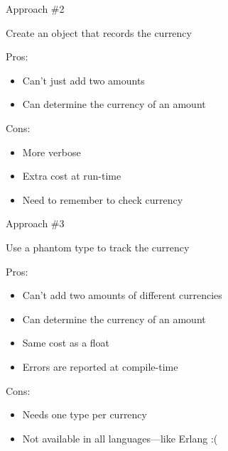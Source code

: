 \documentclass[11pt]{beamer}
\renewcommand\big[1]{
  \begin{center}
    \Large{#1}
  \end{center}
}
\begin{document}
\begin{frame}
  \big{Approach \#2}
  \centering Create an object that records the currency
  \pause
  \vskip1cm
  \begin{minipage}[t]{.48\textwidth}
    Pros:
    \footnotesize
    \begin{itemize}
      \item Can't just add two amounts
      \item Can determine the currency of an amount
    \end{itemize}
  \end{minipage}
  \begin{minipage}[t]{.48\textwidth}
    Cons:
    \footnotesize
    \begin{itemize}
      \item More verbose
      \item Extra cost at run-time
      \item Need to remember to check currency
    \end{itemize}
  \end{minipage}
\end{frame}

\begin{frame}
  \big{Approach \#3}
  \centering Use a phantom type to track the currency
  \pause
  \vskip1cm
  \begin{minipage}[t]{.48\textwidth}
    Pros:
    \footnotesize
    \begin{itemize}
      \item Can't add two amounts of different currencies
      \item Can determine the currency of an amount
      \item Same cost as a float
      \item Errors are reported at compile-time
    \end{itemize}
  \end{minipage}
  \begin{minipage}[t]{.48\textwidth}
    Cons:
    \footnotesize
    \begin{itemize}
      \item Needs one type per currency
      \item Not available in all languages---like Erlang :(
    \end{itemize}
  \end{minipage}
\end{frame}
\end{document}
